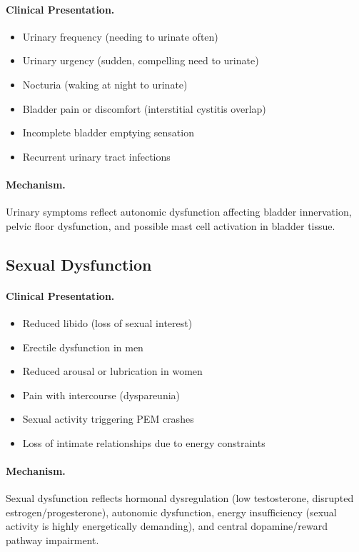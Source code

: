 \paragraph{Clinical Presentation.}
\begin{itemize}
    \item Urinary frequency (needing to urinate often)
    \item Urinary urgency (sudden, compelling need to urinate)
    \item Nocturia (waking at night to urinate)
    \item Bladder pain or discomfort (interstitial cystitis overlap)
    \item Incomplete bladder emptying sensation
    \item Recurrent urinary tract infections
\end{itemize}

\paragraph{Mechanism.}
Urinary symptoms reflect autonomic dysfunction affecting bladder innervation, pelvic floor dysfunction, and possible mast cell activation in bladder tissue.

\subsection{Sexual Dysfunction}
\label{subsec:sexual-dysfunction}

\paragraph{Clinical Presentation.}
\begin{itemize}
    \item Reduced libido (loss of sexual interest)
    \item Erectile dysfunction in men
    \item Reduced arousal or lubrication in women
    \item Pain with intercourse (dyspareunia)
    \item Sexual activity triggering PEM crashes
    \item Loss of intimate relationships due to energy constraints
\end{itemize}

\paragraph{Mechanism.}
Sexual dysfunction reflects hormonal dysregulation (low testosterone, disrupted estrogen/progesterone), autonomic dysfunction, energy insufficiency (sexual activity is highly energetically demanding), and central dopamine/reward pathway impairment.

